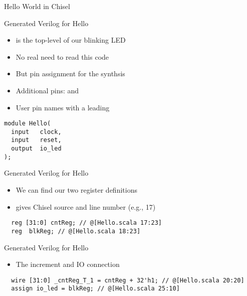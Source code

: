 \begin{frame}[fragile]{Hello World in Chisel}
\end{frame}



\begin{frame}[fragile]{Generated Verilog for Hello}
\begin{itemize}
\item {} is the top-level of our blinking LED
\item No real need to read this code
\item But pin assignment for the synthsis
\item Additional pins:  and 
\item User pin names with a leading 
\end{itemize}
\begin{verbatim}
module Hello(
  input   clock,
  input   reset,
  output  io_led
);
\end{verbatim}
\end{frame}

\begin{frame}[fragile]{Generated Verilog for Hello}
\begin{itemize}
\item We can find our two register definitions
\item {} gives Chisel source and line number (e.g., 17)
\end{itemize}
\begin{verbatim}
  reg [31:0] cntReg; // @[Hello.scala 17:23]
  reg  blkReg; // @[Hello.scala 18:23]
\end{verbatim}
\end{frame}

\begin{frame}[fragile]{Generated Verilog for Hello}
\begin{itemize}
\item The increment and IO connection
\end{itemize}
\begin{verbatim}
  wire [31:0] _cntReg_T_1 = cntReg + 32'h1; // @[Hello.scala 20:20]
  assign io_led = blkReg; // @[Hello.scala 25:10]
\end{verbatim}
\end{frame}

